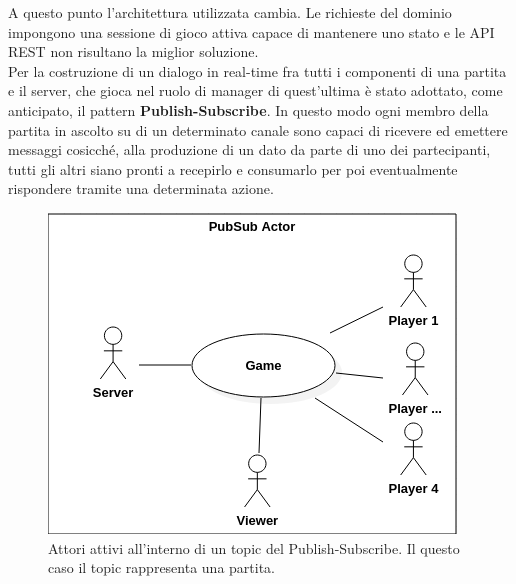             A questo punto l'architettura utilizzata cambia. Le richieste del dominio impongono una sessione di gioco attiva capace di mantenere uno stato e le API REST non risultano la miglior soluzione. \\ 
            Per la costruzione di un dialogo in real-time fra tutti i componenti di una partita e il server, che gioca nel ruolo di manager di quest'ultima è stato adottato, come anticipato, il pattern \textbf{Publish-Subscribe}. 
            In questo modo ogni membro della partita in ascolto su di un determinato canale sono capaci di ricevere ed emettere messaggi cosicché, alla produzione di un dato da parte di uno dei partecipanti, tutti gli altri siano pronti a recepirlo e consumarlo per poi eventualmente rispondere tramite una determinata azione.
            
            \begin{figure}[h!]
                \includegraphics[scale=0.6]{image/PubSubActorDiagram.png}
                \caption{Attori attivi all'interno di un topic del Publish-Subscribe. Il questo caso il topic rappresenta una partita.}
            \end{figure}
            
